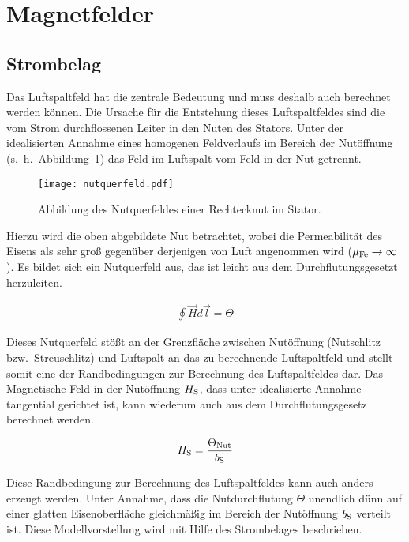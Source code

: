 \section{Magnetfelder}

\subsection{Strombelag}

Das Luftspaltfeld hat die zentrale Bedeutung und muss deshalb auch berechnet werden können.
Die Ursache für die Entstehung dieses Luftspaltfeldes sind die vom Strom durchflossenen Leiter in den Nuten des Stators.
Unter der idealisierten Annahme eines homogenen Feldverlaufs im Bereich der Nutöffnung (s.~h.~Abbildung~\ref{fig:nutquerfeld}) das Feld im Luftspalt vom Feld in der Nut getrennt.

\begin{figure}[!htb]
\centering
\texttt{[image: nutquerfeld.pdf]}
\label{fig:nutquerfeld}
\caption{Abbildung des Nutquerfeldes einer Rechtecknut im Stator.}
\end{figure}

Hierzu wird die oben abgebildete Nut betrachtet, wobei die Permeabilität des Eisens als sehr groß gegenüber derjenigen von Luft angenommen wird ($\mu_{\mathrm{Fe}} \rightarrow \infty$).
Es bildet sich ein Nutquerfeld aus, das ist leicht aus dem Durchflutungsgesetzt herzuleiten.

\begin{align}
\oint \vec{H}d\vec{l} = \Theta \label{eqn:durchflutungsgesetzt}
\end{align}

Dieses Nutquerfeld stößt an der Grenzfläche zwischen Nutöffnung (Nutschlitz bzw.\ Streuschlitz) und Luftspalt an das zu berechnende Luftspaltfeld und stellt somit eine der Randbedingungen zur Berechnung des Luftspaltfeldes dar.
Das Magnetische Feld in der Nutöffnung $H_{\mathrm{S}}$, dass unter idealisierte Annahme tangential gerichtet ist, kann wiederum auch aus dem Durchflutungsgesetz berechnet werden.

\begin{align}
H_{\mathrm{S}} = \frac{\Theta_{\mathrm{Nut}}}{b_{\mathrm{S}}}
\end{align}

Diese Randbedingung zur Berechnung des Luftspaltfeldes kann auch anders erzeugt werden.
Unter Annahme, dass die Nutdurchflutung $\Theta$ unendlich dünn auf einer glatten Eisenoberfläche gleichmäßig im Bereich der Nutöffnung $b_{\mathrm{S}}$ verteilt ist.
Diese Modellvorstellung wird mit Hilfe des Strombelages beschrieben.

